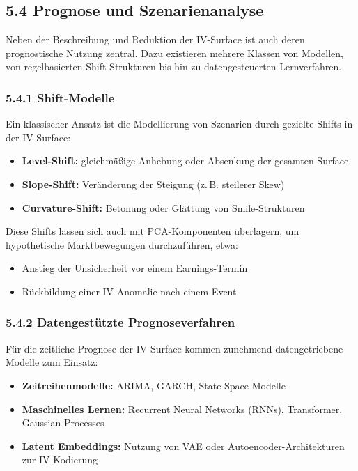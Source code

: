 \documentclass[a4paper,12pt]{article}
\begin{document}
\subsection*{5.4 Prognose und Szenarienanalyse}

Neben der Beschreibung und Reduktion der IV-Surface ist auch deren prognostische Nutzung zentral. Dazu existieren mehrere Klassen von Modellen, von regelbasierten Shift-Strukturen bis hin zu datengesteuerten Lernverfahren.

\subsubsection*{5.4.1 Shift-Modelle}

Ein klassischer Ansatz ist die Modellierung von Szenarien durch gezielte Shifts in der IV-Surface:
\begin{itemize}
  \item \textbf{Level-Shift:} gleichmäßige Anhebung oder Absenkung der gesamten Surface
  \item \textbf{Slope-Shift:} Veränderung der Steigung (z.\,B. steilerer Skew)
  \item \textbf{Curvature-Shift:} Betonung oder Glättung von Smile-Strukturen
\end{itemize}

Diese Shifts lassen sich auch mit PCA-Komponenten überlagern, um hypothetische Marktbewegungen durchzuführen, etwa:
\begin{itemize}
  \item Anstieg der Unsicherheit vor einem Earnings-Termin
  \item Rückbildung einer IV-Anomalie nach einem Event
\end{itemize}

\subsubsection*{5.4.2 Datengestützte Prognoseverfahren}

Für die zeitliche Prognose der IV-Surface kommen zunehmend datengetriebene Modelle zum Einsatz:

\begin{itemize}
  \item \textbf{Zeitreihenmodelle:} ARIMA, GARCH, State-Space-Modelle
  \item \textbf{Maschinelles Lernen:} Recurrent Neural Networks (RNNs), Transformer, Gaussian Processes
  \item \textbf{Latent Embeddings:} Nutzung von VAE oder Autoencoder-Architekturen zur IV-Kodierung
\end{itemize}
\end{document}
